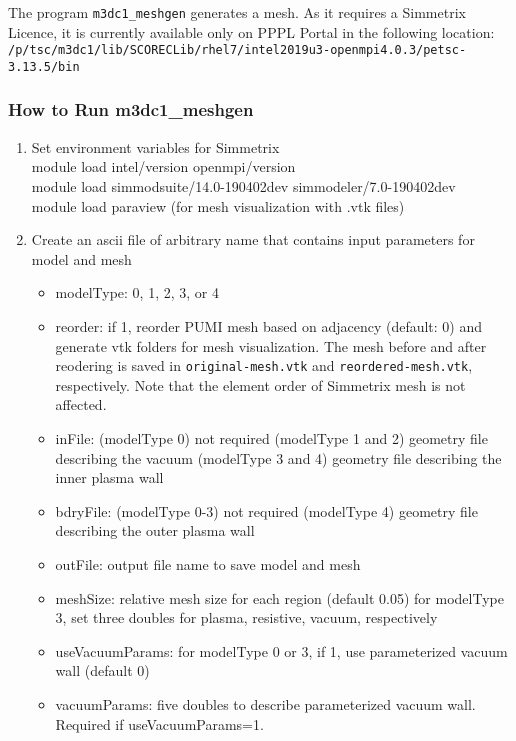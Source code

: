 The program \texttt{m3dc1\_meshgen} generates a mesh. As it requires a Simmetrix Licence, it is currently available only on PPPL Portal in the following location:
\newline\newline
\texttt{/p/tsc/m3dc1/lib/SCORECLib/rhel7/intel2019u3-openmpi4.0.3/petsc-3.13.5/bin}
\newline\newline

\subsubsection{How to Run m3dc1\_meshgen}
\begin{enumerate}
\item Set environment variables for Simmetrix
\newline
\\module load intel/version openmpi/version
\\module load  simmodsuite/14.0-190402dev simmodeler/7.0-190402dev
\\module load paraview (for mesh visualization with .vtk files)
\item	Create an ascii file of arbitrary name that contains input parameters for model and mesh
\begin{itemize}
\item modelType: 0, 1, 2, 3, or 4
\item reorder: if 1, reorder PUMI mesh based on adjacency (default: 0) and generate vtk folders for mesh visualization. The mesh before and after reodering is saved in \texttt{original-mesh.vtk} and \texttt{reordered-mesh.vtk}, respectively. Note that the element order of Simmetrix mesh is not affected.
\item inFile: (modelType 0) not required
(modelType 1 and 2) geometry file describing the vacuum (modelType 3 and 4) geometry file describing the inner plasma wall
\item bdryFile: (modelType 0-3) not required
 (modelType 4) geometry file describing the outer plasma wall
\item outFile: output file name to save model and mesh
\item meshSize: relative mesh size for each region (default 0.05)
\newline
	for modelType 3, set three doubles for plasma, resistive, vacuum, respectively
\item useVacuumParams: for modelType 0 or 3, if 1, use parameterized vacuum wall (default 0)
\item vacuumParams: five doubles to describe parameterized vacuum wall. Required if useVacuumParams=1.

\end{itemize}
\end{enumerate}
